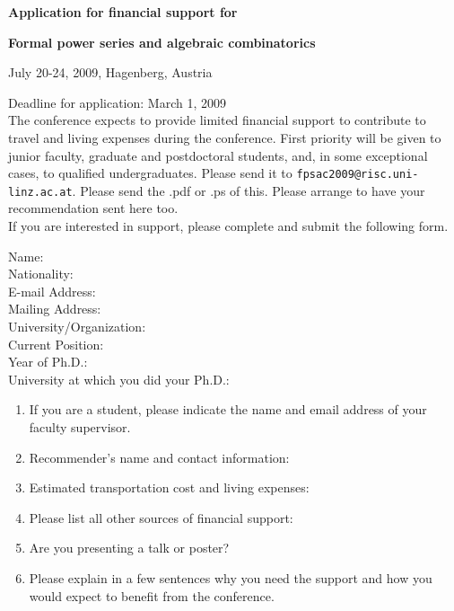 \documentclass{article}
\begin{document}
\centerline{\bf \Large Application for financial support for}
\centerline{\bf \Large Formal power series and algebraic combinatorics}
\centerline{July 20-24, 2009, Hagenberg, Austria}
\medskip
\noindent Deadline for application: March 1, 2009
\medskip\\
\noindent The conference expects to provide limited financial support
to contribute to travel and living expenses during the
conference. First priority will be given to junior faculty, graduate
and postdoctoral students, and, in some exceptional cases, to
qualified undergraduates. Please send it to {\tt fpsac2009@risc.uni-linz.ac.at}. 
Please send the .pdf or .ps of this. Please arrange to have your recommendation sent here too.
\medskip\\
\noindent If you are interested in support, please complete and submit
the following form.
\medskip
\begin{description}
\item[Name:]  

\item[Nationality:]

\item[E-mail Address:]

\item[Mailing Address:]

\item[University/Organization:]

\item[Current Position:]

\item[Year of Ph.D.:]

\item[University at which you did your Ph.D.:]
\end{description}
\begin{enumerate}
\item If you are a student, please indicate the name and email address of
your faculty supervisor.

\item Recommender's name and contact information:

\item Estimated transportation cost and living expenses:
 
\item Please list all other sources of financial support:

\item Are you presenting a talk or poster?

\item Please explain in a few sentences why you need the support and how you would expect to benefit from the conference.
\end{enumerate}
\end{document}
